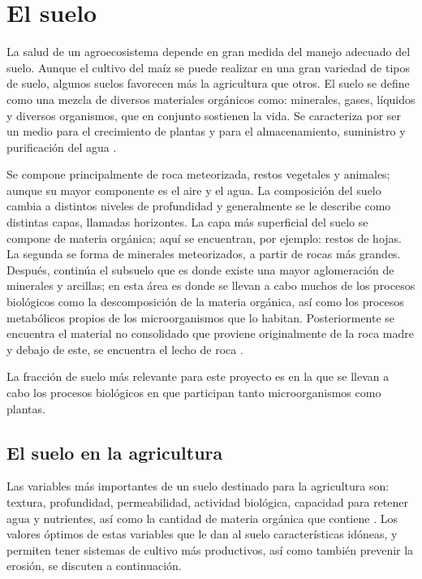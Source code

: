 \documentclass[12pt,letterpaper,oneside]{report}
\begin{document}
\section{El suelo}
La salud de un agroecosistema depende en gran medida del manejo adecuado del suelo. Aunque el cultivo del maíz se puede realizar en una gran variedad de tipos de suelo, algunos suelos favorecen más la agricultura que otros. El suelo se define como una mezcla de diversos materiales orgánicos como: minerales, gases, líquidos y diversos organismos, que en conjunto sostienen la vida. Se caracteriza por ser un medio para el crecimiento de plantas y para el almacenamiento, suministro y purificación del agua \autocite{Tarbuck2005}. 
\par
Se compone principalmente de roca meteorizada, restos vegetales y animales; aunque su mayor componente es el aire y el agua.
La composición del suelo cambia a distintos niveles de profundidad y generalmente se le describe como distintas capas, llamadas horizontes. La capa más superficial del suelo se compone de materia orgánica; aquí se encuentran, por ejemplo: restos de hojas. La segunda se forma de minerales meteorizados, a partir de rocas más grandes. Después, continúa el subsuelo que es donde existe una mayor aglomeración de minerales y arcillas; en esta área es donde se llevan a cabo muchos de los procesos biológicos como la descomposición de la materia orgánica, así como los procesos metabólicos propios de los microorganismos que lo habitan. Posteriormente se encuentra el material no consolidado que proviene originalmente de la roca madre y debajo de este, se encuentra el lecho de roca \autocite{Smith2007}.
\par
La fracción de suelo más relevante para este proyecto es en la que se llevan a cabo los procesos biológicos en que participan tanto microorganismos como plantas.
\subsection{El suelo en la agricultura}
Las variables más importantes de un suelo destinado para la agricultura son: textura, profundidad, permeabilidad, actividad biológica, capacidad para retener agua y nutrientes, así como la cantidad de materia orgánica que contiene \autocite{NRC1993}. Los valores óptimos de estas variables que le dan al suelo características idóneas, y permiten tener sistemas de cultivo más productivos, así como también prevenir la erosión, se discuten a continuación. 
\end{document}
